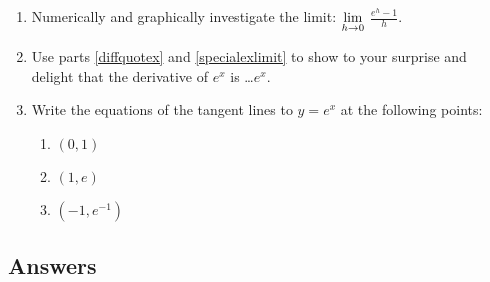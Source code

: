 \begin{enumerate}
\begin{enumerate}
\item\label{specialexlimit}    Numerically and graphically investigate the limit: $\displaystyle{\lim_{h \rightarrow 0}}$ $\frac{e^{h} - 1}{h}$.

\item  Use parts \ref{diffquotex} and \ref{specialexlimit} to show to your surprise and delight that the derivative of $e^{x}$ is \ldots  $e^{x}$.

\item  Write the equations of the tangent lines to $y = e^{x}$ at the following points:

\begin{enumerate}

\item  $(0,1)$

\item  $(1, e)$

\item $\left(-1, e^{-1} \right)$

\end{enumerate}

\end{enumerate}

\setcounter{HW}{\value{enumi}}
\end{enumerate}


\newpage

\subsection{Answers}

